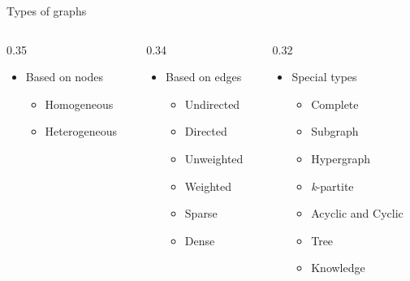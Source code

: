     \begin{frame}{Types of graphs}
        \begin{columns}[t] %
            \begin{column}{0.35\textwidth}
                \begin{itemize}
                    \item \alert{Based on nodes}
                    \begin{itemize}
                        \item Homogeneous
                        \item Heterogeneous
                    \end{itemize}
                \end{itemize}
            \end{column}
            
            \begin{column}{0.34\textwidth}
                \begin{itemize}
                    \item \alert{Based on edges}
                    \begin{itemize}
                        \item Undirected
                        \item Directed
                        \item Unweighted
                        \item Weighted
                        \item Sparse
                        \item Dense
                    \end{itemize}
                \end{itemize}
            \end{column}

            \begin{column}{0.32\textwidth}
                \begin{itemize}
                    \item \alert{Special types}
                    \begin{itemize}
                        \item Complete
                        \item Subgraph
                        \item Hypergraph
                        \item \textit{k}-partite
                        \item Acyclic and Cyclic
                        \item Tree
                        \item Knowledge            
                    \end{itemize}
                \end{itemize}
            \end{column}
        \end{columns}


\end{frame}
